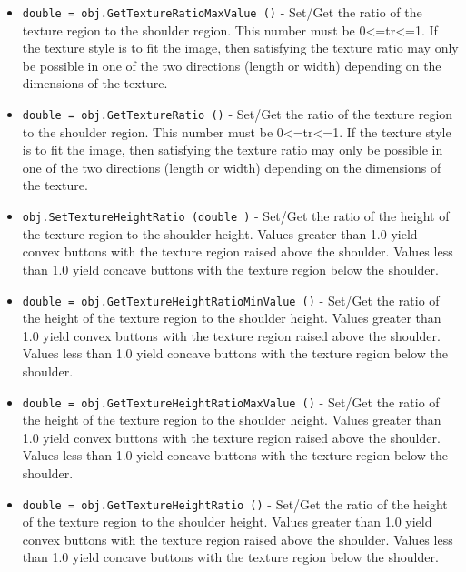 \begin{itemize}
\item  \verb|double = obj.GetTextureRatioMaxValue ()| -  Set/Get the ratio of the texture region to the
 shoulder region. This number must be 0<=tr<=1.
 If the texture style is to fit the image, then satisfying
 the texture ratio may only be possible in one of the
 two directions (length or width) depending on the 
 dimensions of the texture.

\item  \verb|double = obj.GetTextureRatio ()| -  Set/Get the ratio of the texture region to the
 shoulder region. This number must be 0<=tr<=1.
 If the texture style is to fit the image, then satisfying
 the texture ratio may only be possible in one of the
 two directions (length or width) depending on the 
 dimensions of the texture.

\item  \verb|obj.SetTextureHeightRatio (double )| -  Set/Get the ratio of the height of the texture region
 to the shoulder height. Values greater than 1.0 yield
 convex buttons with the texture region raised above the
 shoulder. Values less than 1.0 yield concave buttons with
 the texture region below the shoulder.

\item  \verb|double = obj.GetTextureHeightRatioMinValue ()| -  Set/Get the ratio of the height of the texture region
 to the shoulder height. Values greater than 1.0 yield
 convex buttons with the texture region raised above the
 shoulder. Values less than 1.0 yield concave buttons with
 the texture region below the shoulder.

\item  \verb|double = obj.GetTextureHeightRatioMaxValue ()| -  Set/Get the ratio of the height of the texture region
 to the shoulder height. Values greater than 1.0 yield
 convex buttons with the texture region raised above the
 shoulder. Values less than 1.0 yield concave buttons with
 the texture region below the shoulder.

\item  \verb|double = obj.GetTextureHeightRatio ()| -  Set/Get the ratio of the height of the texture region
 to the shoulder height. Values greater than 1.0 yield
 convex buttons with the texture region raised above the
 shoulder. Values less than 1.0 yield concave buttons with
 the texture region below the shoulder.

\end{itemize}

